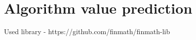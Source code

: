 \section{Algorithm value prediction}\label{sec:algorithm-value-prediction}

Used library - https://github.com/finmath/finmath-lib
